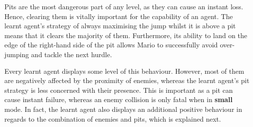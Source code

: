Pits are the most dangerous part of any level, as they can cause an instant loss. Hence, clearing them is vitally important for the capability of an agent. The learnt agent's strategy of always maximising the jump whilst it is above a pit means that it clears the majority of them. Furthermore, its ability to land on the edge of the right-hand side of the pit allows Mario to successfully avoid over-jumping and tackle the next hurdle.

Every learnt agent displays some level of this behaviour. However, most of them are negatively affected by the proximity of enemies, whereas the learnt agent's pit strategy is less concerned with their presence. This is important as a pit can cause instant failure, whereas an enemy collision is only fatal when in \textbf{small} mode. In fact, the learnt agent also displays an additional positive behaviour in regards to the combination of enemies and pits, which is explained next.


\clearpage


